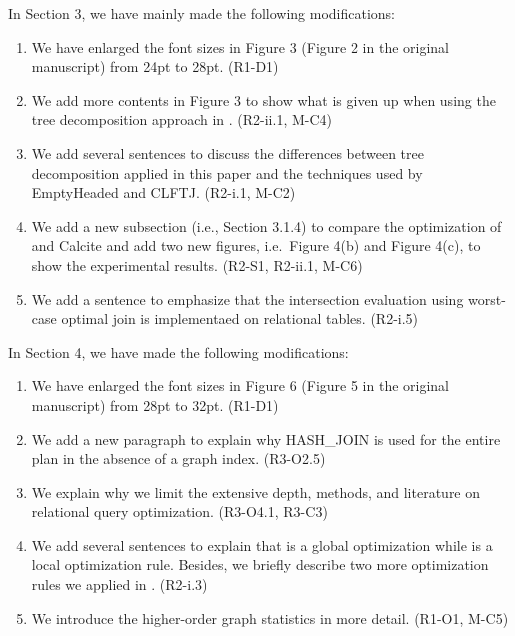 \documentclass{article}
\begin{document}
In Section 3, we have mainly made the following modifications:
\begin{enumerate}
	\item We have enlarged the font sizes in Figure 3 (Figure 2 in the original manuscript) from 24pt to 28pt. (R1-D1)
	\item We add more contents in Figure 3 to show what is given up when using the tree decomposition approach in \name. (R2-ii.1, M-C4)
	\item We add several sentences to discuss the differences between tree decomposition applied in this paper and the techniques used by EmptyHeaded and CLFTJ. (R2-i.1, M-C2)
	\item We add a new subsection (i.e., Section 3.1.4) to compare the optimization of \name and Calcite and add two new figures, i.e.~Figure 4(b) and Figure 4(c), to show the experimental results. (R2-S1, R2-ii.1, M-C6)
	\item We add a sentence to emphasize that the intersection evaluation using worst-case optimal join is implementaed on relational tables. (R2-i.5)
\end{enumerate}

In Section 4, we have made the following modifications:
\begin{enumerate}
	\item We have enlarged the font sizes in Figure 6 (Figure 5 in the original manuscript) from 28pt to 32pt. (R1-D1)
	\item We add a new paragraph to explain why HASH\_JOIN is used for the entire plan in the absence of a graph index. (R3-O2.5)
	\item We explain why we limit the extensive depth, methods, and literature on relational query optimization. (R3-O4.1, R3-C3)
	\item We add several sentences to explain that \filterrule is a global optimization while \fusionrule is a local optimization rule. Besides, we briefly describe two more optimization rules we applied in \name. (R2-i.3)
	\item We introduce the higher-order graph statistics in more detail. (R1-O1, M-C5)
\end{enumerate}
\end{document}
